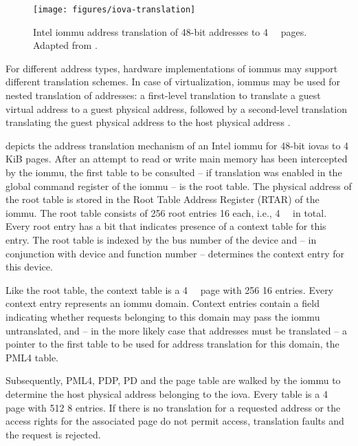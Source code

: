 \begin{figure}[!b]
    \centering
    \texttt{[image: figures/iova-translation]}
    \caption{Intel \acs{iommu} address translation of 48-bit addresses to
    \SI{4}{\kibi\byte} pages. Adapted from \cite{morgan2018iommu}.}
    \label{fig:translation}
\end{figure}

For different address types, hardware implementations of \acp{iommu} may support
different translation schemes. In case of virtualization, \acp{iommu} may be
used for nested translation of addresses: a first-level translation to translate
a guest virtual address to a guest physical address, followed by a second-level
translation translating the guest physical address to the host physical address
\cite[pp.~43~ff.]{intel2019iommu}.

 depicts the address translation mechanism of an Intel
\ac{iommu} for 48-bit \acp{iova} to 4 KiB pages. After an attempt to read or
write main memory has been intercepted by the \ac{iommu}, the first table to be
consulted -- if translation was enabled in the global command register of the
\ac{iommu} -- is the root table. The physical address of the root table is
stored in the Root Table Address Register (RTAR) of the \ac{iommu}. The root
table consists of 256 root entries \SI{16}{\byte} each, i.e., \SI{4}{\kibi\byte}
in total. Every root entry has a bit that indicates presence of a context table
for this entry. The root table is indexed by the bus number of the device and --
in conjunction with device and function number -- determines the context entry
for this device.

Like the root table, the context table is a \SI{4}{\kibi\byte} page with 256
\SI{16}{\byte} entries. Every context entry represents an \ac{iommu} domain.
Context entries contain a field indicating whether requests belonging to this
domain may pass the \ac{iommu} untranslated, and -- in the more likely case that
addresses must be translated -- a pointer to the first table to be used for
address translation for this domain, the PML4 table.

Subsequently, PML4, PDP, PD and the page table are walked by the \ac{iommu} to
determine the host physical address belonging to the \ac{iova}. Every table is a
\SI{4}{\kibi\byte} page with 512 \SI{8}{\byte} entries. If there is no
translation for a requested address or the access rights for the associated page
do not permit access, translation faults and the request is rejected.


